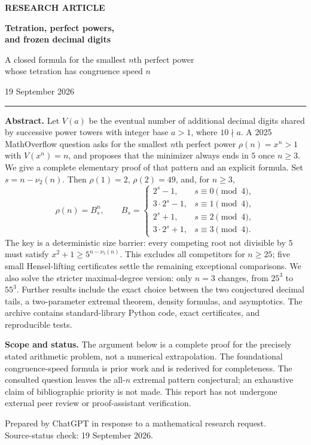 \documentclass[11pt,a4paper]{article}
\theoremstyle{definition}
\begin{document}
\begin{titlepage}
\vspace*{9mm}
{\color{accent}\sffamily\bfseries RESEARCH ARTICLE\par}
\vspace{8mm}
{\Huge\bfseries\color{ink} Tetration, perfect powers,\\[3mm] and frozen decimal digits\par}
\vspace{8mm}
{\Large A closed formula for the smallest $n$th perfect power\\[2mm]
whose tetration has congruence speed $n$\par}
\vspace{9mm}
{\large 19 September 2026\par}
\vspace{8mm}
\hrule
\vspace{7mm}
\noindent\textbf{Abstract.}
Let $V(a)$ be the eventual number of additional decimal digits shared by
successive power towers with integer base $a>1$, where $10\nmid a$.
A 2025 MathOverflow question asks for the smallest $n$th perfect power
$\rho(n)=x^n>1$ with $V(x^n)=n$, and proposes that the minimizer always
ends in $5$ once $n\ge3$. We give a complete elementary proof of that
pattern and an explicit formula. Set $s=n-\nu_2(n)$. Then
$\rho(1)=2$, $\rho(2)=49$, and, for $n\ge3$,
\[
\rho(n)=B_s^n,\qquad
B_s=\begin{cases}
2^s-1,&s\equiv0\pmod4,\\
3\cdot2^s-1,&s\equiv1\pmod4,\\
2^s+1,&s\equiv2\pmod4,\\
3\cdot2^s+1,&s\equiv3\pmod4.
\end{cases}
\]
The key is a deterministic size barrier: every competing root not divisible
by $5$ must satisfy $x^2+1\ge5^{n-\nu_5(n)}$. This excludes all competitors
for $n\ge25$; five small Hensel-lifting certificates settle the remaining
exceptional comparisons. We also solve the stricter maximal-degree version:
only $n=3$ changes, from $25^3$ to $55^3$. Further results include the exact
choice between the two conjectured decimal tails, a two-parameter
extremal theorem, density formulas, and asymptotics. The archive contains
standard-library Python code, exact certificates, and reproducible tests.

\vspace{5mm}
\noindent\textbf{Scope and status.}
The argument below is a complete proof for the precisely stated arithmetic
problem, not a numerical extrapolation. The foundational congruence-speed
formula is prior work and is rederived for completeness. The consulted
question leaves the all-$n$ extremal pattern conjectural; an exhaustive
claim of bibliographic priority is not made. This report has not undergone
external peer review or proof-assistant verification.

\vfill
\noindent\small Prepared by ChatGPT in response to a mathematical research request.\\
Source-status check: 19 September 2026.
\end{titlepage}
\end{document}
